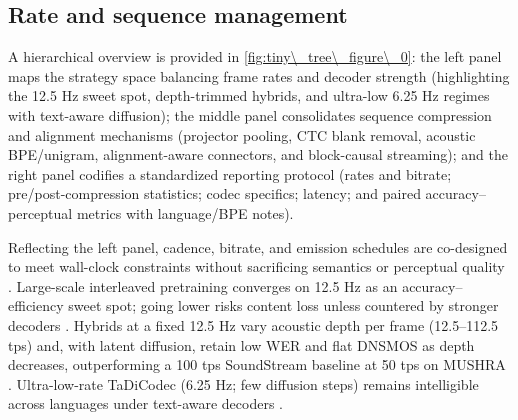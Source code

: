 \documentclass{article}
\begin{document}
\subsection{Rate and sequence management} \label{subsec:Rate and sequence management}
A hierarchical overview is provided in \autoref{fig:tiny\_tree\_figure\_0}: the left panel maps the strategy space balancing frame rates and decoder strength (highlighting the 12.5 Hz sweet spot, depth-trimmed hybrids, and ultra-low 6.25 Hz regimes with text-aware diffusion); the middle panel consolidates sequence compression and alignment mechanisms (projector pooling, CTC blank removal, acoustic BPE/unigram, alignment-aware connectors, and block-causal streaming); and the right panel codifies a standardized reporting protocol (rates and bitrate; pre/post-compression statistics; codec specifics; latency; and paired accuracy--perceptual metrics with language/BPE notes).

Reflecting the left panel, cadence, bitrate, and emission schedules are co-designed to meet wall-clock constraints without sacrificing semantics or perceptual quality \cite{zhao2024textlessstreamingspeechtranslationsemant,liu2024analyzingmitigatinginconsistencydiscrete,zhang2025impactframeratesspeechtokenizercasestudy,huang2024repcodecspeechrepresentationcodectokeniz}. Large-scale interleaved pretraining converges on 12.5 Hz as an accuracy--efficiency sweet spot; going lower risks content loss unless countered by stronger decoders \cite{zeng2024scalingspeechtextpretrainingsyntheticint}. Hybrids at a fixed 12.5 Hz vary acoustic depth per frame (12.5--112.5 tps) and, with latent diffusion, retain low WER and flat DNSMOS as depth decreases, outperforming a 100 tps SoundStream baseline at 50 tps on MUSHRA \cite{yang2025diffsoundstreamefficientspeechtokenizati}. Ultra-low-rate TaDiCodec (6.25 Hz; few diffusion steps) remains intelligible across languages under text-aware decoders \cite{wang2025tadicodectextawarediffusionspeechtokeniz}.
\end{document}
